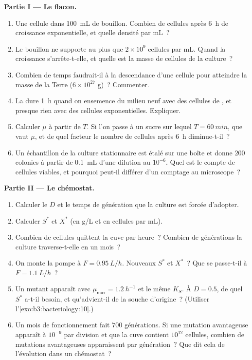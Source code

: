 \begin{problem}
\medskip
\noindent\textbf{Partie I --- Le flacon.}
\begin{enumerate}
  \item Une cellule dans \qty{100}{mL} de bouillon. Combien de cellules
        après \qty{6}{h} de croissance exponentielle, et quelle densité
        par mL~?
  \item Le bouillon ne supporte au plus que $2\times 10^{9}$ cellules
        par mL. Quand la croissance s'arrête-t-elle, et quelle est la
        masse de cellules de la culture~?
  \item Combien de temps faudrait-il à la descendance d'une cellule
        pour atteindre la masse de la Terre ($6\times 10^{27}$ g)~?
        Commenter.
  \item La  dure \qty{1}{h} quand on ensemence du
        milieu neuf avec des cellules de , et presque
        rien avec des cellules exponentielles. Expliquer.
  \item Calculer $\mu$ à partir de $T$. Si l'on passe à un sucre sur
        lequel $T = \qty{60}{min}$, que vaut $\mu$, et de quel facteur
        le nombre de cellules après \qty{6}{h} diminue-t-il~?
  \item Un échantillon de la culture stationnaire est étalé sur une
        boîte et donne $200$ colonies à partir de \qty{0.1}{mL} d'une
        dilution au $10^{-6}$. Quel est le compte de cellules viables,
        et pourquoi peut-il différer d'un comptage au microscope~?
\end{enumerate}

\medskip
\noindent\textbf{Partie II --- Le chémostat.}
\begin{enumerate}[resume]
  \item Calculer le  $D$ et le temps de génération que
        la culture est forcée d'adopter.
  \item Calculer $S^{*}$ et $X^{*}$ (en g/L et en cellules par mL).
  \item Combien de cellules quittent la cuve par heure~? Combien de
        générations la culture traverse-t-elle en un mois~?
  \item On monte la pompe à $F = \qty{0.95}{L/h}$. Nouveaux $S^{*}$ et
        $X^{*}$~? Que se passe-t-il à $F = \qty{1.1}{L/h}$~?
  \item Un mutant apparaît avec $\mu_{\max} = \qty{1.2}{h^{-1}}$ et le
        même $K_{S}$. À $D = 0.5$, de quel $S^{*}$ a-t-il besoin, et
        qu'advient-il de la souche d'origine~? (Utiliser
        l'\cref{exo:b3:bacteriology:10}.)
  \item Un mois de fonctionnement fait $700$ générations. Si une
        mutation avantageuse apparaît à $10^{-9}$ par division et que
        la cuve contient $10^{12}$ cellules, combien de mutations
        avantageuses apparaissent par génération~? Que dit cela de
        l'évolution dans un chémostat~?
\end{enumerate}


\end{problem}
